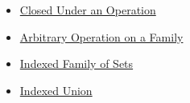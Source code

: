 \begin{dependencies}
\begin{itemize}
  \item \hyperref[def:closed-under-operation]{Closed Under an Operation}
  \item \hyperref[def:arbitrary-operation-on-family]{Arbitrary Operation on a Family}
  \item \hyperref[def:indexed-family]{Indexed Family of Sets}
  \item \hyperref[def:indexed-union]{Indexed Union}
\end{itemize}
\end{dependencies}
